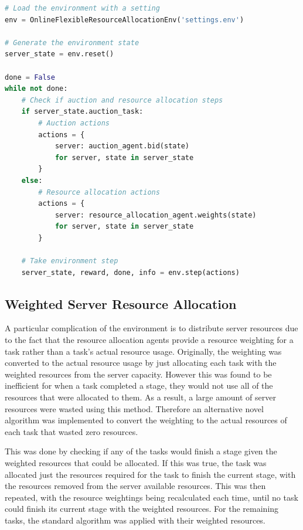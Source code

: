 \begin{lstlisting}[language=Python, frame=single, captionpos=b, label={lst:example_flexible_resource_env},
                   caption={Example running of the Online Flexible Resource allocation environment}]
# Load the environment with a setting
env = OnlineFlexibleResourceAllocationEnv('settings.env')

# Generate the environment state
server_state = env.reset()

done = False
while not done:
    # Check if auction and resource allocation steps
    if server_state.auction_task:
        # Auction actions
        actions = {
            server: auction_agent.bid(state)
            for server, state in server_state
        }
    else:
        # Resource allocation actions
        actions = {
            server: resource_allocation_agent.weights(state)
            for server, state in server_state
        }

    # Take environment step
    server_state, reward, done, info = env.step(actions)
\end{lstlisting}

\subsection{Weighted Server Resource Allocation}
\label{subsec:weighted-server-resource-allocation}
A particular complication of the environment is to distribute server resources due to the fact that the resource
allocation agents provide a resource weighting for a task rather than a task's actual resource usage. Originally, the
weighting was converted to the actual resource usage by just allocating each task with the weighted resources from
the server capacity. However this was found to be inefficient for when a task completed a stage, they
would not use all of the resources that were allocated to them. As a result, a large amount of server resources
were wasted using this method. Therefore an alternative novel algorithm was implemented to convert the weighting to
the actual resources of each task that wasted zero resources.

This was done by checking if any of the tasks would finish a stage given the weighted resources that could be allocated.
If this was true, the task was allocated just the resources required for the task to finish the current stage,
with the resources removed from the server available resources. This was then repeated, with the resource weightings
being recalculated each time, until no task could finish its current stage with the weighted resources. For the
remaining tasks, the standard algorithm was applied with their weighted resources.

